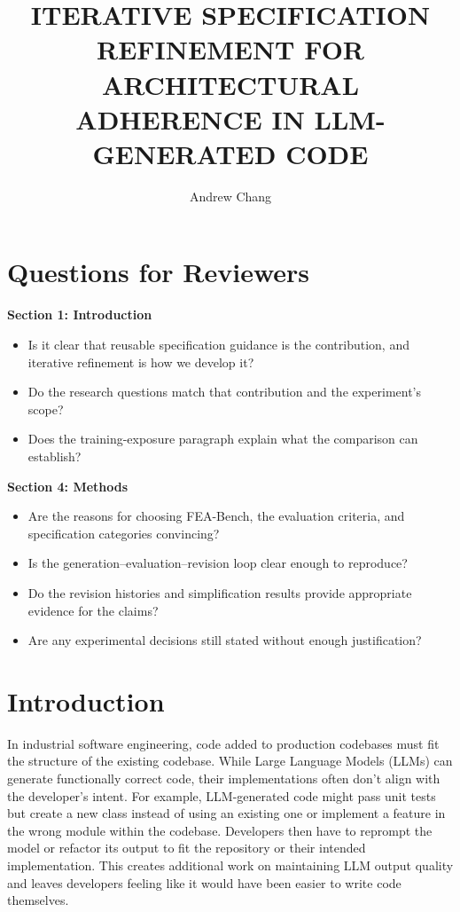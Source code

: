 \documentclass[sigconf,nonacm]{acmart}
\author{Andrew Chang}
\affiliation{%
  \institution{Carnegie Mellon University}
  \city{Pittsburgh}
  \country{USA}}
\begin{document}
\title{ITERATIVE SPECIFICATION REFINEMENT FOR ARCHITECTURAL ADHERENCE IN LLM-GENERATED CODE}
\maketitle

\section*{Questions for Reviewers}

\noindent\textbf{Section 1: Introduction}
\begin{itemize}
  \item Is it clear that reusable specification guidance is the contribution, and iterative refinement is how we develop it?
  \item Do the research questions match that contribution and the experiment's scope?
  \item Does the training-exposure paragraph explain what the comparison can establish?
\end{itemize}

\noindent\textbf{Section 4: Methods}
\begin{itemize}
  \item Are the reasons for choosing FEA-Bench, the evaluation criteria, and specification categories convincing?
  \item Is the generation--evaluation--revision loop clear enough to reproduce?
  \item Do the revision histories and simplification results provide appropriate evidence for the claims?
  \item Are any experimental decisions still stated without enough justification?
\end{itemize}

\section{Introduction}

In industrial software engineering, code added to production codebases must fit the structure of the existing codebase. While Large Language Models (LLMs) can generate functionally correct code, their implementations often don't align with the developer's intent. For example, LLM-generated code might pass unit tests but create a new class instead of using an existing one or implement a feature in the wrong module within the codebase. Developers then have to reprompt the model or refactor its output to fit the repository or their intended implementation. This creates additional work on maintaining LLM output quality and leaves developers feeling like it would have been easier to write code themselves.
\end{document}
